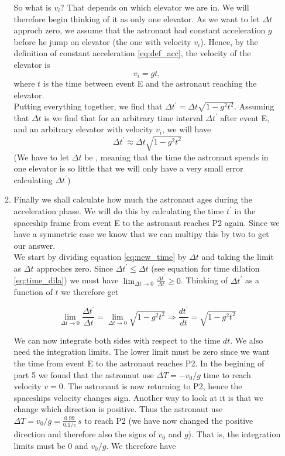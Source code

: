\documentclass[a4paper,10pt,english]{article}
\begin{document}
\begin{enumerate}
\begin{enumerate}
So what is $v_{i}$? That depends on which elevator we are in. We will therefore begin thinking of it as only one elevator. As we want to let $\Delta t$ approch zero, we assume that the astronaut had constant acceleration $g$ before he jump on  elevator (the one with velocity $v_{i}$). Hence, by the definition of constant acceleration \ref{eq:def_acc}, the velocity of the elevator is \[v_{i}=gt,\] where $t$ is the time between event E and the astronaut reaching the elevator.
\\
Putting everything together, we find that $\Delta t^{\prime}=\Delta t\sqrt{1-g^{2}t^{2}}$. Assuming that $\Delta t$ is  we find that for an arbitrary time interval $\Delta t^{\prime}$ after event E, and an arbitrary elevator with velocity $v_{i}$, we will have \begin{equation}\label{eq:new_time}\Delta t^{\prime}\approx\Delta t\sqrt{1-g^{2}t^{2}}\end{equation}
(We have to let $\Delta t$ be , meaning that the time the astronaut spends in one elevator is so little that we will only have a very small error calculating $\Delta t^{\prime}$)


\item Finally we shall calculate how much the astronaut ages during the acceleration phase. We will do this by calculating the time $t^{\prime}$ in the spaceship frame from event E to the astronaut reaches P2 again. Since we have a symmetric case we know that we can multipy this by two to get our answer.
\\
We start by dividing equation \ref{eq:new_time} by $\Delta t$ and taking the limit as $\Delta t$ approches zero. Since $\Delta t^{\prime}\leq\Delta t$ (see equation for time dilation \ref{eq:time_dila}) we must have $\lim_{\Delta t\to0}\frac{\Delta t^{\prime}}{\Delta t}\geq0$. Thinking of $\Delta t^{\prime}$ as a function of $t$ we therefore get

\[\lim_{\Delta t\to0}\frac{\Delta t^{\prime}}{\Delta t}=\lim_{\Delta t\to0}\sqrt{1-g^{2}t^{2}}\Rightarrow\frac{dt^{\prime}}{dt}=\sqrt{1-g^{2}t^{2}}\]

We can now integrate both sides with respect to the time $dt$. We also need the integration limits. The lower limit must be zero since we want the time from event E to the astronaut reaches P2. In the begining of part 5 we found that the astronaut use $\Delta T=-v_{0}/g$ time to reach velocity $v=0$. The astronaut is now returning to P2, hence the spaceships velocity changes sign. Another way to look at it is that we change which direction is positive. Thus the astronaut use $\Delta T=v_{0}/g=\frac{0.99}{0.1/c}\,s$ to reach P2 (we have now changed the positive direction and therefore also the signs of $v_{0}$ and $g$). That is, the integration limits must be $0$ and $v_{0}/g$. %
We therefore have


\end{enumerate}
\end{enumerate}
\end{document}
